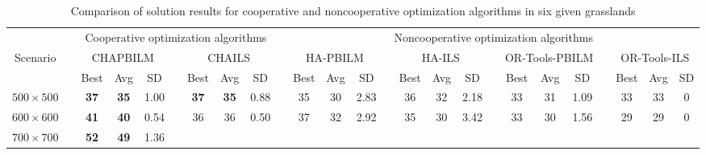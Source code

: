 \documentclass[preprint,5pt]{elsarticle}
\begin{document}
\begin{table}[htbp]
\scriptsize
\centering
\begin{threeparttable}
\caption{Comparison of solution results for cooperative and noncooperative optimization algorithms in six given grasslands}\label{Solution-results}
\begin{center}
\setlength{\tabcolsep}{0.30em}
\begin{tabular}{ccccccccccccccccccccccccc}
\hline\hline%
&\multicolumn{1}{c}{}  &\multicolumn{7}{c}{Cooperative optimization algorithms}   &\multicolumn{1}{c}{} &\multicolumn{15}{c}{Noncooperative optimization algorithms} \\
\cline{3-9} \cline{11-25}
\multicolumn{1}{c}{Scenario}  &\multicolumn{1}{c}{}  &\multicolumn{3}{c}{CHAPBILM}   &\multicolumn{1}{c}{} &\multicolumn{3}{c}{CHAILS}   &\multicolumn{1}{c}{} &\multicolumn{3}{c}{HA-PBILM}  &\multicolumn{1}{c}{} &\multicolumn{3}{c}{HA-ILS} &\multicolumn{1}{c}{} &\multicolumn{3}{c}{OR-Tools-PBILM}  &\multicolumn{1}{c}{} &\multicolumn{3}{c}{OR-Tools-ILS} \\
\cline{3-5} \cline{7-9} \cline{11-13} \cline{15-17} \cline{19-21} \cline{23-25}%
    &&Best &Avg &SD   &&Best &Avg &SD  &&Best &Avg &SD  &&Best &Avg &SD  &&Best &Avg &SD  &&Best &Avg &SD \\
\hline
  $500\times 500$   &&{\cellcolor[rgb]{0.729,0.729,0.729}}\textbf{37} &{\cellcolor[rgb]{0.729,0.729,0.729}}\textbf{35}   &{\cellcolor[rgb]{0.729,0.729,0.729}}1.00
                    &&{\cellcolor[rgb]{0.729,0.729,0.729}}\textbf{37} &{\cellcolor[rgb]{0.729,0.729,0.729}}\textbf{35}   &{\cellcolor[rgb]{0.729,0.729,0.729}}0.88
                    &&35   &30   &2.83
                    &&36   &32   &2.18
                    &&33   &31   &1.09
                    &&33   &33   &0      \\
  $600\times 600$  &&{\cellcolor[rgb]{0.729,0.729,0.729}}\textbf{41} &{\cellcolor[rgb]{0.729,0.729,0.729}}\textbf{40}   &{\cellcolor[rgb]{0.729,0.729,0.729}}0.54
                   &&{\cellcolor[rgb]{0.729,0.729,0.729}}36 &{\cellcolor[rgb]{0.729,0.729,0.729}}36  &{\cellcolor[rgb]{0.729,0.729,0.729}}0.50
                   &&37 &32 &2.92
                   &&35   &30   &3.42
                   &&33   &30   &1.56
                   &&29   &29    &0      \\
  $700\times 700$  &&{\cellcolor[rgb]{0.729,0.729,0.729}}\textbf{52} &{\cellcolor[rgb]{0.729,0.729,0.729}}\textbf{49}   &{\cellcolor[rgb]{0.729,0.729,0.729}}1.36

\end{tabular}
\end{center}
\end{threeparttable}
\end{table}
\end{document}
